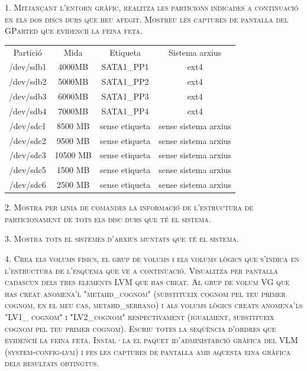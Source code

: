 \documentclass[a4paper,12pt]{article}
\begin{document}


\textsc{1. Mitjançant l'entorn gràfic, realitza les particions indicades a continuació en els dos discs durs que heu afegit. Mostreu les captures de pantalla del GParted que evidenciï la feina feta.}
\begin{center}
	\begin{tabular}{|c|c|c|c|}
		\hline
		Partició & Mida & Etiqueta & Sistema arxius \\ \hhline{|*{4}{=|}}
		/dev/sdb1 & 4000MB & SATA1\_PP1 & ext4 \\ \hline
		/dev/sdb2 & 5000MB & SATA1\_PP2 & ext4 \\ \hline
		/dev/sdb3 & 6000MB & SATA1\_PP3 & ext4 \\ \hline
		/dev/sdb4 & 7000MB & SATA1\_PP4 & ext4 \\ \hline
		/dev/sdc1 & 8500 MB & sense etiqueta & sense sistema arxius \\ \hline
		/dev/sdc2 & 9500 MB & sense etiqueta & sense sistema arxius \\ \hline
		/dev/sdc3 & 10500 MB & sense etiqueta & sense sistema arxius \\ \hline
		/dev/sdc5 & 1500 MB & sense etiqueta & sense sistema arxius \\ \hline
		/dev/sdc6 & 2500 MB & sense etiqueta & sense sistema arxius \\ \hline
	\end{tabular}
\end{center}

\textsc{2. Mostra per linia de comandes la informació de l'estructura de particionament de tots els disc durs que té el sistema.}

\textsc{3. Mostra tots el sistemes d'arxius muntats  que té el sistema.}

\textsc{4. Crea els volums físics, el grup de volums i els volums lògics que s'indica en  l'estructura de l'esquema que ve a continuació. Visualitza per pantalla cadascun dels tres elements LVM que has creat. Al grup de volum VG que has creat anomena'l "metahd\-\_cognom" (substitueix cognom pel teu primer cognom, en el meu cas, metahd\_serrano) i als volums lògics creats anomena'ls "LV1\_ cognom" i "LV2\_cognom" respectivament (igualment, substitueix cognom pel teu primer cognom). Escriu totes la seqüència d'ordres que evidenciï la feina feta. Instal·la el paquet id'administarció gràfica del VLM (system-config-lvm) i fes les captures de pantalla amb aquesta eina gràfica dels resultats obtingtus.}
\end{document}
